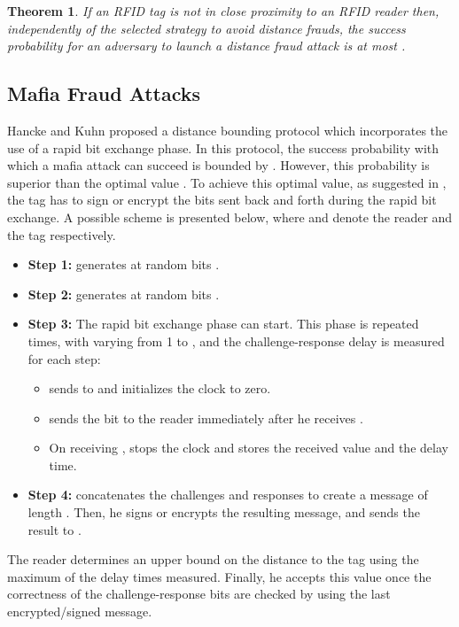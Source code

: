 \documentclass{article}
\newtheorem{theorem}{Theorem}\newtheorem{proposition}[theorem]{Proposition}
\begin{document}
\begin{theorem}\label{th::distance}
If an RFID tag is not in close proximity to an RFID reader then, independently of the selected strategy  to avoid distance frauds, the success probability for an adversary to launch a distance fraud attack is at most  \cite{brands94}.
\end{theorem}

\subsection{Mafia Fraud Attacks}

Hancke and Kuhn \cite{hancke05}  proposed a distance bounding protocol which incorporates the use of a rapid bit exchange phase. In this protocol, the success probability with which a mafia attack can succeed is bounded by  \cite{TuP-2007-rfidtechnology}.  However, this probability is superior than the optimal value .   To achieve this optimal value, as suggested in \cite{KimAKSP-2008-icisc,brands94}, the tag has to sign or encrypt the bits sent back and forth during the rapid bit exchange. A possible scheme is presented below, where  and  denote the reader and the tag respectively.
    \begin{itemize}
      \item \textbf{Step 1:}  generates at random  bits .
      \item \textbf{Step 2:}  generates at random  bits .
       \item \textbf{Step 3:} The rapid bit exchange phase can start. This phase is repeated  times, with  varying from 1 to , and the challenge-response delay is measured for each step:
           \begin{itemize}
             \item   sends  to  and initializes the clock to zero.
             \item  sends the bit   to the reader  immediately after he receives .
             \item On receiving ,  stops the clock and stores the received value and the delay time.
           \end{itemize}
      \item \textbf{Step 4:}  concatenates the challenges and responses to create a message  of length . Then, he signs or encrypts the resulting message, and sends the result to .
    \end{itemize}

The reader  determines an upper bound on the distance to the tag using the maximum of the delay times measured.  Finally, he accepts this value once the correctness of the challenge-response bits are checked by using the last encrypted/signed message.
\end{document}
